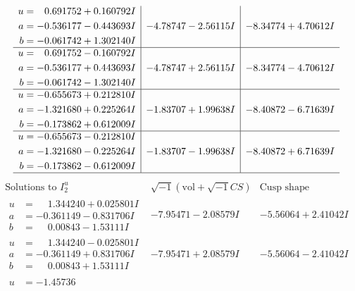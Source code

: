\documentclass[1p]{elsarticle_modified}
\theoremstyle{definition}
\newcommand{\I}{\sqrt{-1}}
\begin{document}
$$\begin{array}{c|c|c}
\begin{aligned}
u &= \phantom{-}0.691752 + 0.160792 I \\
a &= -0.536177 - 0.443693 I \\
b &= -0.061742 + 1.302140 I\end{aligned}
 & -4.78747 - 2.56115 I & -8.34774 + 4.70612 I \\ \hline\begin{aligned}
u &= \phantom{-}0.691752 - 0.160792 I \\
a &= -0.536177 + 0.443693 I \\
b &= -0.061742 - 1.302140 I\end{aligned}
 & -4.78747 + 2.56115 I & -8.34774 - 4.70612 I \\ \hline\begin{aligned}
u &= -0.655673 + 0.212810 I \\
a &= -1.321680 + 0.225264 I \\
b &= -0.173862 + 0.612009 I\end{aligned}
 & -1.83707 + 1.99638 I & -8.40872 - 6.71639 I \\ \hline\begin{aligned}
u &= -0.655673 - 0.212810 I \\
a &= -1.321680 - 0.225264 I \\
b &= -0.173862 - 0.612009 I\end{aligned}
 & -1.83707 - 1.99638 I & -8.40872 + 6.71639 I\\
 \hline 
 \end{array}$$\newpage$$\begin{array}{c|c|c}  
\text{Solutions to }I^u_{2}& \I (\text{vol} + \sqrt{-1}CS) & \text{Cusp shape}\\
 \hline 
\begin{aligned}
u &= \phantom{-}1.344240 + 0.025801 I \\
a &= -0.361149 - 0.831706 I \\
b &= \phantom{-}0.00843 - 1.53111 I\end{aligned}
 & -7.95471 - 2.08579 I & -5.56064 + 2.41042 I \\ \hline\begin{aligned}
u &= \phantom{-}1.344240 - 0.025801 I \\
a &= -0.361149 + 0.831706 I \\
b &= \phantom{-}0.00843 + 1.53111 I\end{aligned}
 & -7.95471 + 2.08579 I & -5.56064 - 2.41042 I \\ \hline\begin{aligned}
u &= -1.45736\phantom{ +0.000000I} \\

\end{aligned}
\end{array}$$
\end{document}

